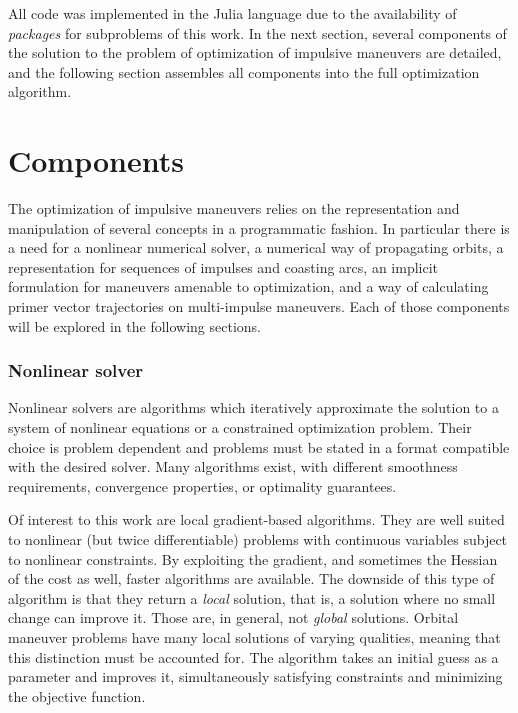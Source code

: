 
All code was implemented in the Julia language due to the availability of \textit{packages} for subproblems of this work. In the next section, several components of the solution to the problem of optimization of impulsive maneuvers are detailed, and the following section assembles all components into the full optimization algorithm.

\section{Components}

The optimization of impulsive maneuvers relies on the representation and manipulation of several concepts in a programmatic fashion. In particular there is a need for a nonlinear numerical solver, a numerical way of propagating orbits, a representation for sequences of impulses and coasting arcs, an implicit formulation for maneuvers amenable to optimization, and a way of calculating primer vector trajectories on multi-impulse maneuvers. Each of those components will be explored in the following sections.

\subsubsection{Nonlinear solver}\label{sssec:solver}

Nonlinear solvers are algorithms which iteratively approximate the solution to a system of nonlinear equations or a constrained optimization problem. Their choice is problem dependent and problems must be stated in a format compatible with the desired solver. Many algorithms exist, with different smoothness requirements, convergence properties, or optimality guarantees. 

Of interest to this work are local gradient-based algorithms. They are well suited to nonlinear (but twice differentiable) problems with continuous variables subject to nonlinear constraints. By exploiting the gradient, and sometimes the Hessian of the cost as well, faster algorithms are available. The downside of this type of algorithm is that they return a \textit{local} solution, that is, a solution where no small change can improve it. Those are, in general, not \textit{global} solutions. Orbital maneuver problems have many local solutions of varying qualities, meaning that this distinction must be accounted for. The algorithm takes an initial guess as a parameter and improves it, simultaneously satisfying constraints and minimizing the objective function.


